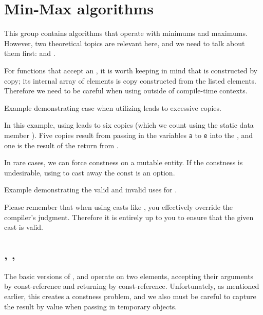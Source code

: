 \section{Min-Max algorithms}

This group contains algorithms that operate with minimums and maximums. However, two theoretical topics are relevant here, and we need to talk about them first:  and .

For functions that accept an , it is worth keeping in mind that  is constructed by copy; its internal array of elements is copy constructed from the listed elements. Therefore we need to be careful when using  outside of compile-time contexts.

\begin{box-note}
\footnotesize Example demonstrating case when utilizing  leads to excessive copies.
\tcblower
{}
\end{box-note}

In this example, using  leads to six copies (which we count using the static data member ). Five copies result from passing in the variables \texttt{a} to \texttt{e} into the , and one is the result of the return from .

In rare cases, we can force constness on a mutable entity. If the constness is undesirable, using  to cast away the const is an option.

\begin{box-note}
\footnotesize Example demonstrating the valid and invalid uses for .
\tcblower
{}
\end{box-note}

Please remember that when using casts like , you effectively override the compiler's judgment. Therefore it is entirely up to you to ensure that the given cast is valid.

\subsection{\texorpdfstring{, , }{\texttt{std::min}, \texttt{std::max}, \texttt{std::minmax}}}

The basic versions of ,  and  operate on two elements, accepting their arguments by const-reference and returning by const-reference. Unfortunately, as mentioned earlier, this creates a constness problem, and we also must be careful to capture the result by value when passing in temporary objects.

